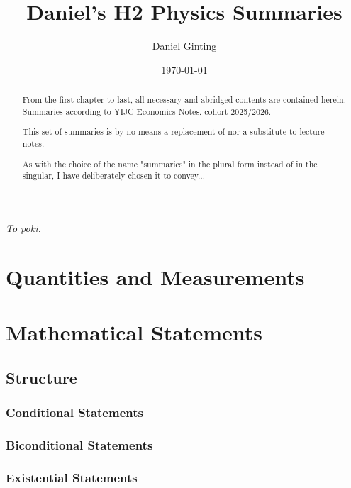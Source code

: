 \documentclass[a4paper]{article}
\title{Daniel's H2 Physics Summaries}
\author{Daniel Ginting}
\date{\today}
\begin{document}
	
\maketitle

\newpage
\thispagestyle{empty}

\vspace*{\fill}
\begin{center}
	\emph{To poki.}
\end{center}
\vspace*{\fill}

\newpage

\begin{abstract}

From the first chapter to last, all necessary and abridged contents are contained herein. Summaries according to YIJC Economics Notes, cohort 2025/2026.

This set of summaries is by no means a replacement of nor a substitute to lecture notes.

As with the choice of the name "summaries" in the plural form instead of in the singular, I have deliberately chosen it to convey...

\end{abstract}




\section{Quantities and Measurements}


\section{Mathematical Statements}

\subsection{Structure}

\subsubsection{Conditional Statements}

\subsubsection{Biconditional Statements}

\subsubsection{Existential Statements}
\end{document}
